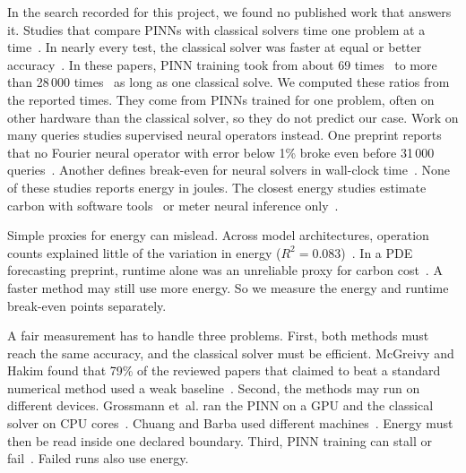 \documentclass[conference]{IEEEtran}
\begin{document}
In the search recorded for this project, we found no published work that answers it. Studies that compare PINNs with classical solvers time one problem at a time~\cite{grossmann2024,chuang2022,markidis2021}. In nearly every test, the classical solver was faster at equal or better accuracy~\cite{grossmann2024}. In these papers, PINN training took from about 69 times~\cite{markidis2021} to more than 28\,000 times~\cite{chuang2022} as long as one classical solve. We computed these ratios from the reported times. They come from PINNs trained for one problem, often on other hardware than the classical solver, so they do not predict our case. Work on many queries studies supervised neural operators instead. One preprint reports that no Fourier neural operator with error below 1\% broke even before 31\,000 queries~\cite{huang2026review}. Another defines break-even for neural solvers in wall-clock time~\cite{zhang2026}. None of these studies reports energy in joules. The closest energy studies estimate carbon with software tools~\cite{kapoor2025} or meter neural inference only~\cite{yoo2026}.

Simple proxies for energy can mislead. Across model architectures, operation counts explained little of the variation in energy ($R^2=0.083$)~\cite{henderson2020}. In a PDE forecasting preprint, runtime alone was an unreliable proxy for carbon cost~\cite{wilson2025}. A faster method may still use more energy. So we measure the energy and runtime break-even points separately.

A fair measurement has to handle three problems. First, both methods must reach the same accuracy, and the classical solver must be efficient. McGreivy and Hakim found that 79\% of the reviewed papers that claimed to beat a standard numerical method used a weak baseline~\cite{mcgreivy2024}. Second, the methods may run on different devices. Grossmann et~al. ran the PINN on a GPU and the classical solver on CPU cores~\cite{grossmann2024}. Chuang and Barba used different machines~\cite{chuang2022}. Energy must then be read inside one declared boundary. Third, PINN training can stall or fail~\cite{krishnapriyan2021,wang2022ntk,rathore2024}. Failed runs also use energy.
\end{document}
